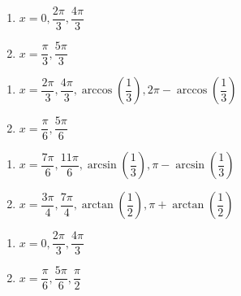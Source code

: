 \begin{multicols}{2}

\begin{enumerate}

\setcounter{enumi}{\value{HW}}

\item $x = 0, \dfrac{2\pi}{3}, \dfrac{4\pi}{3}$
\item  $x=\dfrac{\pi}{3}, \dfrac{5\pi}{3}$

\setcounter{HW}{\value{enumi}}

\end{enumerate}

\end{multicols}

\begin{multicols}{2}

\begin{enumerate}

\setcounter{enumi}{\value{HW}}

\item  $x = \dfrac{2\pi}{3}, \dfrac{4\pi}{3}, \arccos\left(\dfrac{1}{3}\right), 2\pi -\arccos\left(\dfrac{1}{3}\right) $
\item  $x=\dfrac{\pi}{6}, \dfrac{5\pi}{6}$

\setcounter{HW}{\value{enumi}}

\end{enumerate}

\end{multicols}

\begin{multicols}{2}

\begin{enumerate}

\setcounter{enumi}{\value{HW}}

\item  $x = \dfrac{7\pi}{6}, \dfrac{11\pi}{6}, \arcsin\left(\dfrac{1}{3}\right), \pi - \arcsin\left(\dfrac{1}{3}\right) $
\item  $x=\dfrac{3\pi}{4}, \dfrac{7\pi}{4}, \arctan\left(\dfrac{1}{2}\right), \pi +\arctan\left(\dfrac{1}{2}\right) $

\setcounter{HW}{\value{enumi}}

\end{enumerate}

\end{multicols}

\begin{multicols}{2}

\begin{enumerate}

\setcounter{enumi}{\value{HW}}

\item  $x=0, \dfrac{2\pi}{3}, \dfrac{4\pi}{3}$
\item  $x=\dfrac{\pi}{6}, \dfrac{5\pi}{6}, \dfrac{\pi}{2}$

\setcounter{HW}{\value{enumi}}

\end{enumerate}

\end{multicols}

